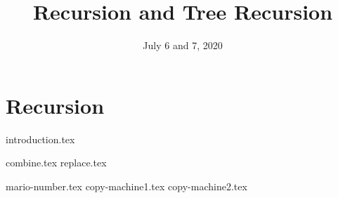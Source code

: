 \documentclass{exam}
\title{Recursion and Tree Recursion}
\date{July 6 and 7, 2020}
\begin{document}
\maketitle

\section{Recursion}
{introduction.tex}
\begin{questions}
{combine.tex}
\newpage
{replace.tex}

\newpage
{mario-number.tex}
{copy-machine1.tex}
\newpage
{copy-machine2.tex}
\end{questions}
\end{document}

